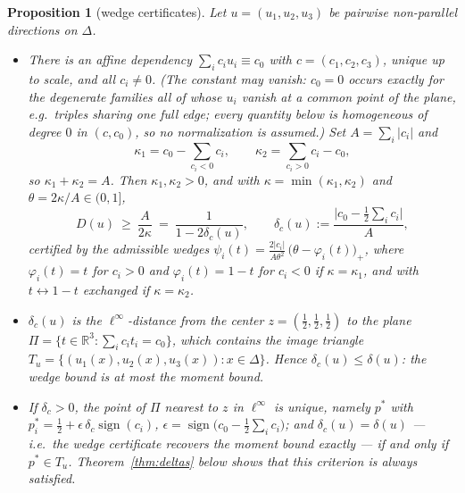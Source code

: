 \documentclass[11pt,reqno]{amsart}
\theoremstyle{plain}
\newtheorem{proposition}[theorem]{Proposition}
\theoremstyle{definition}
\theoremstyle{remark}
\newcommand{\R}{\mathbb{R}}
\begin{document}
\begin{proposition}[wedge certificates]\label{prop:wedge}
Let $u=(u_1,u_2,u_3)$ be pairwise non-parallel directions on $\Delta$.
\begin{itemize}
\item[(i)] There is an affine dependency $\sum_ic_iu_i\equiv c_0$ with
$c=(c_1,c_2,c_3)$, unique up to scale, and all $c_i\ne0$. (The constant may
vanish: $c_0=0$ occurs exactly for the degenerate families all of whose
$u_i$ vanish at a common point of the plane, e.g.\ triples sharing one full
edge; every quantity below is homogeneous of degree $0$ in $(c,c_0)$, so no
normalization is assumed.) Set
$A=\sum_i|c_i|$ and
\[
\kappa_1=c_0-\sum_{c_i<0}c_i,\qquad \kappa_2=\sum_{c_i>0}c_i-c_0 ,
\]
so $\kappa_1+\kappa_2=A$. Then $\kappa_1,\kappa_2>0$, and with
$\kappa=\min(\kappa_1,\kappa_2)$ and $\theta=2\kappa/A\in(0,1]$,
\[
D(u)\ \ge\ \frac{A}{2\kappa}\ =\ \frac1{1-2\delta_c(u)},\qquad
\delta_c(u):=\frac{\bigl|c_0-\tfrac12\sum_ic_i\bigr|}{A},
\]
certified by the admissible wedges
$\psi_i(t)=\frac{2|c_i|}{A\theta^2}\,\bigl(\theta-\varphi_i(t)\bigr)_+$, where
$\varphi_i(t)=t$ for $c_i>0$ and $\varphi_i(t)=1-t$ for $c_i<0$ if
$\kappa=\kappa_1$, and with $t\leftrightarrow1-t$ exchanged if
$\kappa=\kappa_2$.
\item[(ii)] $\delta_c(u)$ is the $\ell^\infty$-distance from the center
$z=(\tfrac12,\tfrac12,\tfrac12)$ to the plane
$\Pi=\{t\in\R^3:\sum_ic_it_i=c_0\}$, which contains the image triangle
$T_u=\{(u_1(x),u_2(x),u_3(x)):x\in\Delta\}$. Hence
$\delta_c(u)\le\delta(u)$: the wedge bound is at most the moment bound.
\item[(iii)] If $\delta_c>0$, the point of $\Pi$ nearest to $z$ in
$\ell^\infty$ is unique, namely $p^\ast$ with
$p^\ast_i=\tfrac12+\epsilon\,\delta_c\operatorname{sign}(c_i)$,
$\epsilon=\operatorname{sign}\bigl(c_0-\tfrac12\sum_ic_i\bigr)$; and
$\delta_c(u)=\delta(u)$ --- i.e.\ the wedge certificate recovers the moment
bound exactly --- if and only if $p^\ast\in T_u$. Theorem~\ref{thm:deltas}
below shows that this criterion is \emph{always} satisfied.
\end{itemize}
\end{proposition}
\end{document}
